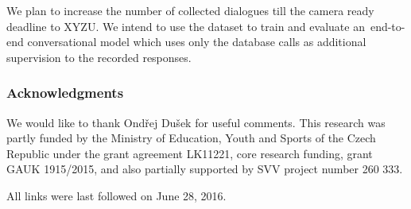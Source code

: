 \documentclass[runningheads,a4paper]{llncs}
\newcommand{\commentontext}[2]{\colorbox{yellow!60}{#1}\pdfcomment[color={0.234 0.867 0.211},hoffset=-6pt,voffset=10pt,opacity=0.5]{#2}}
\begin{document}
We plan to increase the number of collected dialogues till the camera ready deadline to XYZU.
We intend to use the dataset to train and evaluate an~end-to-end conversational model which uses only the database calls as additional supervision to the recorded responses. 

\subsubsection*{Acknowledgments}
We would like to thank Ond\v{r}ej Du\v{s}ek for useful comments.
This research was partly funded by the Ministry of Education, Youth and Sports of the Czech Republic under the grant agreement LK11221, core research funding, grant GAUK 1915/2015, and also partially supported by SVV project number 260 333. 

%
%
%
%
%
%





All links were last followed on June 28, 2016.
\end{document}
